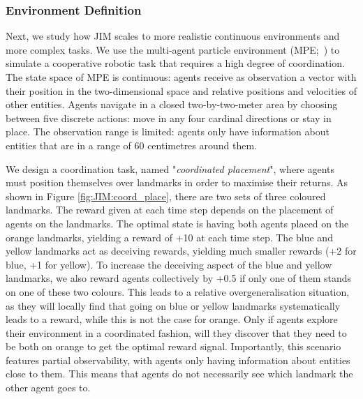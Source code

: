 \subsubsection{Environment Definition}

Next, we study how JIM scales to more realistic continuous environments and more complex tasks. We use the multi-agent particle environment (MPE;~\cite{Lowe2017_MADDPG}) to simulate a cooperative robotic task that requires a high degree of coordination. The state space of MPE is continuous: agents receive as observation a vector with their position in the two-dimensional space and relative positions and velocities of other entities. Agents navigate in a closed two-by-two-meter area by choosing between five discrete actions: move in any four cardinal directions or stay in place. The observation range is limited: agents only have information about entities that are in a range of 60 centimetres around them. 

We design a coordination task, named "\textit{coordinated placement}", where agents must position themselves over landmarks in order to maximise their returns. As shown in Figure \ref{fig:JIM:coord_place}, there are two sets of three coloured landmarks. The reward given at each time step depends on the placement of agents on the landmarks. The optimal state is having both agents placed on the orange landmarks, yielding a reward of +10 at each time step. The blue and yellow landmarks act as deceiving rewards, yielding much smaller rewards (+2 for blue, +1 for yellow). To increase the deceiving aspect of the blue and yellow landmarks, we also reward agents collectively by +0.5 if only one of them stands on one of these two colours. This leads to a relative overgeneralisation situation, as they will locally find that going on blue or yellow landmarks systematically leads to a reward, while this is not the case for orange. Only if agents explore their environment in a coordinated fashion, will they discover that they need to be both on orange to get the optimal reward signal. Importantly, this scenario features partial observability, with agents only having information about entities close to them. This means that agents do not necessarily see which landmark the other agent goes to. 

